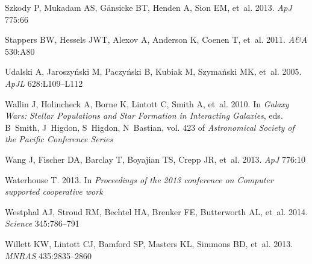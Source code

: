 \documentclass{ar2e}
\def\apj{ApJ}
\def\apjl{ApJL}
\def\aap{A{\&}A}
\def\mnras{MNRAS}
\begin{document}
\begin{thebibliography}{}
{Szkody} P, {Mukadam} AS, {G{\"a}nsicke} BT, {Henden} A, {Sion} EM, et~al.
  2013.
\newblock \textit{\apj} 775:66

{Stappers} BW, {Hessels} JWT, {Alexov} A, {Anderson} K, {Coenen} T, et~al.
  2011.
\newblock \textit{\aap} 530:A80

{Udalski} A, {Jaroszy{\'n}ski} M, {Paczy{\'n}ski} B, {Kubiak} M,
  {Szyma{\'n}ski} MK, et~al. 2005.
\newblock \textit{\apjl} 628:L109--L112

{Wallin} J, {Holincheck} A, {Borne} K, {Lintott} C, {Smith} A, et~al. 2010.
\newblock In \textit{Galaxy Wars: Stellar Populations and Star Formation in
  Interacting Galaxies}, eds. B~{Smith}, J~{Higdon}, S~{Higdon}, N~{Bastian},
  vol. 423 of \textit{Astronomical Society of the Pacific Conference Series}

{Wang} J, {Fischer} DA, {Barclay} T, {Boyajian} TS, {Crepp} JR, et~al. 2013.
\newblock \textit{\apj} 776:10

{Waterhouse} T. 2013.
\newblock In \textit{Proceedings of the 2013 conference on Computer supported
  cooperative work}

{Westphal} AJ, {Stroud} RM, {Bechtel} HA, {Brenker} FE, {Butterworth} AL,
  et~al. 2014.
\newblock \textit{Science} 345:786--791

{Willett} KW, {Lintott} CJ, {Bamford} SP, {Masters} KL, {Simmons} BD, et~al.
  2013.
\newblock \textit{\mnras} 435:2835--2860

\end{thebibliography}



\end{document}
